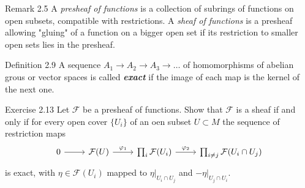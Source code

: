\begin{thing5}{Remark 2.5}\leavevmode
	A \textit{presheaf of functions} is a collection of subrings of functions on open subsets, compatible with restrictions. A \textit{sheaf of functions} is a presheaf allowing "gluing" of a function on a bigger open set if its restriction to smaller open sets lies in the presheaf.
\end{thing5}

\begin{thing3}{Definition 2.9}\leavevmode
	A sequence $A_1 \longrightarrow A_2 \longrightarrow A_3 \longrightarrow \ldots$ of homomorphisms of abelian grous or vector spaces is called \textit{\textbf{exact}} if the image of each map is the kernel of the next one.
\end{thing3}

\begin{thing4}{Exercise 2.13}\label{exer:2.13}\leavevmode
Let $ \mathcal{F}$ be a presheaf of functions. Show that $\mathcal{F}$ is a sheaf if and only if for every open cover $\{ U_i\}$ of an oen subset $U\subset M$ the sequence of restriction maps
\[\begin{tikzcd}0\arrow[r]&\mathcal{F}(U)\arrow[r,"\varphi_1"]&\prod_{i}\mathcal{F}(U_i)\arrow[r,"\varphi_2"]&\prod_{i \neq  j}\mathcal{F}(U_i \cap U_j)\end{tikzcd}\]
 is exact, with $\eta \in \mathcal{F}(U_i)$ mapped to $\eta|_{U_i \cap U_j}$ and $-\eta|_{U_j \cap U_i}$.
\end{thing4}

